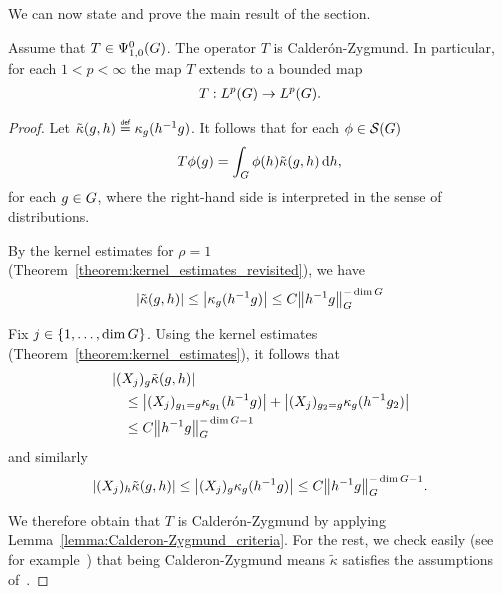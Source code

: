 We can now state and prove the main result of the section.

\begin{proposition}
\label{proposition:Lp_boundedness}
    Assume that $T \in \OperatorClass 0 {1, 0}$.
    The operator $T$ is Calder\'on-Zygmund.
    In particular, for each $1 < p < \infty$
    the map $T$ extends to a bounded map
    \begin{align*}
        T : \Lebesgue p \Group \to \Lebesgue p \Group.
    \end{align*}
\end{proposition}
\begin{proof}
    Let $\tilde \kappa(g, h) \defeq \kappa_g(h^{-1} g)$.
    It follows that for each $\phi \in \Schwartz \Group$
    \begin{align*}
        T \phi(g) = \int_{\Group} \phi(h) \tilde \kappa(g, h) \dd h,
    \end{align*}
    for each $g \in \Group$,
    where the right-hand side is interpreted in the sense of distributions.

    By the kernel estimates for $\rho = 1$ (Theorem~\ref{theorem:kernel_estimates_revisited}),
    we have
    \begin{align*}
        \abs {\tilde \kappa(g, h)} \leq \abs {\kappa_g(h^{-1} g)} \leq C \norm [\Group] {h^{-1} g}^{-\dim \Group}
    \end{align*}

    Fix $j \in \{1, \dots, \dim \Group\}$.
    Using the kernel estimates (Theorem~\ref{theorem:kernel_estimates}),
    it follows that
    \begin{align*}
        &\abs {(\LeftDifferentialOperatorFirstOrder {X_j})_{g} \tilde \kappa(g, h)}\\
        &\quad \leq
        \abs {(X_j)_{g_1 = g} \kappa_{g_1}(h^{-1} g)}
        + \abs {(X_j)_{g_2 = g} \kappa_{g}(h^{-1} g_2)}\\
        &\quad \leq
        C \norm [\Group] {h^{-1} g}^{-\dim \Group - 1}
    \end{align*}
    and similarly
    \begin{align*}
        \abs {(\LeftDifferentialOperatorFirstOrder {X_j})_{h} \tilde \kappa(g, h)}
        \leq \abs {(X_j)_{g} \kappa_{g}(h^{-1} g)}
        \leq C \norm [\Group] {h^{-1} g}^{-\dim \Group - 1}.
    \end{align*}

    We therefore obtain that $T$ is Calder\'on-Zygmund by applying Lemma~\ref{lemma:Calderon-Zygmund_criteria}.
    For the rest,
    we check easily (see for example~\cite[Proposition 3.2.17]{FischerRuzhansky16})
    that being Calderon-Zygmund means $\tilde \kappa$ satisfies the assumptions of~\cite[Theorem A.4.4]{FischerRuzhansky16}.
\end{proof}

